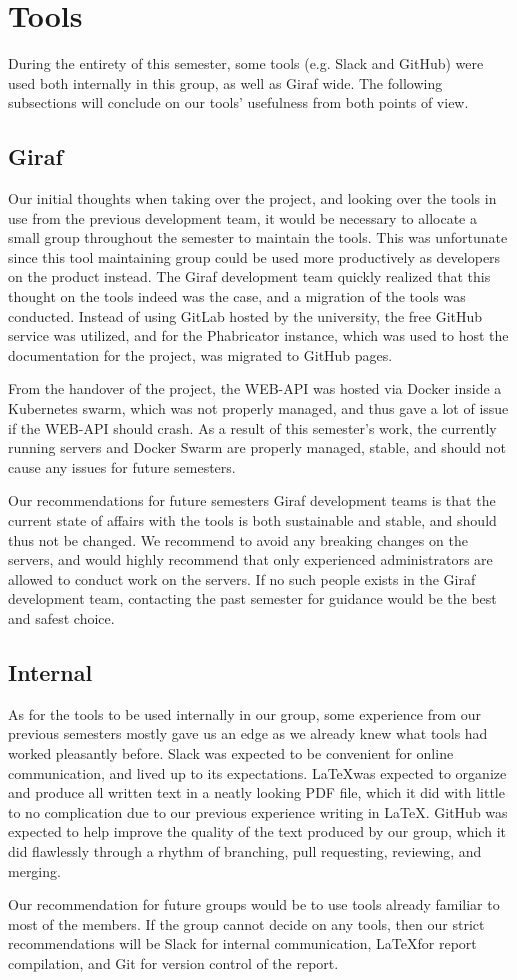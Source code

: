\section{Tools}
During the entirety of this semester, some tools (e.g. Slack and GitHub) were used both internally in this group, as well as Giraf wide.
The following subsections will conclude on our tools' usefulness from both points of view.

\subsection{Giraf}
Our initial thoughts when taking over the project, and looking over the tools in use from the previous development team, it would be necessary to allocate a small group throughout the semester to maintain the tools.
This was unfortunate since this tool maintaining group could be used more productively as developers on the product instead.
The Giraf development team quickly realized that this thought on the tools indeed was the case, and a migration of the tools was conducted.
Instead of using GitLab hosted by the university, the free GitHub service was utilized, and for the Phabricator instance, which was used to host the documentation for the project, was migrated to GitHub pages.

From the handover of the project, the WEB-API was hosted via Docker inside a Kubernetes swarm, which was not properly managed, and thus gave a lot of issue if the WEB-API should crash.
As a result of this semester's work, the currently running servers and Docker Swarm are properly managed, stable, and should not cause any issues for future semesters.

Our recommendations for future semesters Giraf development teams is that the current state of affairs with the tools is both sustainable and stable, and should thus not be changed.
We recommend to avoid any breaking changes on the servers, and would highly recommend that only experienced administrators are allowed to conduct work on the servers.
If no such people exists in the Giraf development team, contacting the past semester for guidance would be the best and safest choice.

\subsection{Internal}
As for the tools to be used internally in our group, some experience from our previous semesters mostly gave us an edge as we already knew what tools had worked pleasantly before.
Slack was expected to be convenient for online communication, and lived up to its expectations.
\LaTeX was expected to organize and produce all written text in a neatly looking PDF file, which it did with little to no complication due to our previous experience writing in \LaTeX.
GitHub was expected to help improve the quality of the text produced by our group, which it did flawlessly through a rhythm of branching, pull requesting, reviewing, and merging.

Our recommendation for future groups would be to use tools already familiar to most of the members.
If the group cannot decide on any tools, then our strict recommendations will be Slack for internal communication, \LaTeX for report compilation, and Git for version control of the report.
